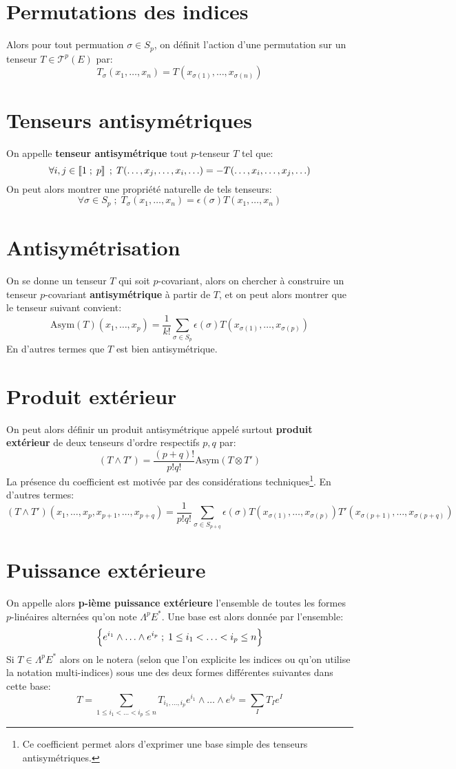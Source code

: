    \section{Permutations des indices}
   Alors pour tout permuation \(\sigma \in S_p\), on définit l'action d'une permutation sur un tenseur \( T \in \mathscr{T}^p(E) \) par:
   \[ 
      T_\sigma(x_1, \ldots, x_n) = T(x_{\sigma(1)}, \ldots, x_{\sigma(n)})
   \]
   \pagebreak

   \section{Tenseurs antisymétriques}
   On appelle \textbf{tenseur antisymétrique} tout \( p \)-tenseur \( T \) tel que:
   \[ 
      \forall i, j \in \left\llbracket{1}\;;\;{p}\right\rrbracket \; ; \; T(\ldots, x_j, \ldots, x_i, \ldots) = -T(\ldots, x_i, \ldots, x_j, \ldots)
   \]
   On peut alors montrer une propriété naturelle de tels tenseurs:
   \[ 
      \forall \sigma \in S_p \; ; \; T_\sigma(x_1, \ldots, x_n) = \epsilon(\sigma)T(x_1, \ldots, x_n) 
   \]
   \section{Antisymétrisation}
   On se donne un tenseur \(T\) qui soit \(p\)-covariant, alors on chercher à construire un tenseur \(p\)-covariant \textbf{antisymétrique} à partir de \(T\), et on peut alors montrer que le tenseur suivant convient:
   \[
      \text{Asym}(T)(x_1, \ldots, x_p) = \frac{1}{k!}\sum_{\sigma \in S_p}\epsilon(\sigma)T(x_{\sigma(1)}, \ldots, x_{\sigma(p)})
   \]
   En d'autres termes que \( T \) est bien antisymétrique. 
   \section{Produit extérieur}
   On peut alors définir un produit antisymétrique appelé surtout \textbf{produit extérieur} de deux tenseurs d'ordre respectifs \( p, q \) par:
   \[
      (T \wedge T') = \frac{(p+q)!}{p!q!}\text{Asym}(T \otimes T')
   \]
   La présence du coefficient est motivée par des considérations techniques\footnote[1]{Ce coefficient permet alors d'exprimer une base simple des tenseurs antisymétriques.}. En d'autres termes:
   \[
      (T \wedge T')(x_1, \ldots, x_p, x_{p+1}, \ldots, x_{p+q}) =  \frac{1}{p!q!}\sum_{\sigma \in S_{p+q}}\epsilon(\sigma) T(x_{\sigma(1)}, \ldots, x_{\sigma(p)})T'(x_{\sigma(p+1)}, \ldots, x_{\sigma(p+q)})
   \]
   \section{Puissance extérieure}
   On appelle alors \textbf{p-ième puissance extérieure} l'ensemble de toutes les formes \(p\)-linéaires alternées qu'on note \(\Lambda^p E^*\). Une base est alors donnée par l'ensemble:
   \[
      \Bigl\{ e^{i_1} \wedge \ldots \wedge e^{i_p} \; ; \; 1 \leq i_1 < \ldots < i_p \leq n  \Bigl\}
   \]
   Si \( T \in \Lambda^p E^*\) alors on le notera (selon que l'on explicite les indices ou qu'on utilise la notation multi-indices) sous une des deux formes différentes suivantes dans cette base:
   \[ 
      T = \sum_{1 \leq i_1 < \ldots < i_p \leq n} T_{i_1, \ldots, i_p} e^{i_1} \wedge \ldots \wedge e^{i_p} = \sum_{I} T_{I} e^I 
   \]  
